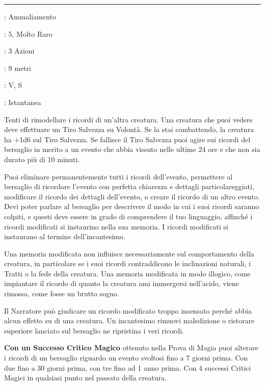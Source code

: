 \begin{multicols}{2}
\smallskip\noindent\rule{\linewidth}{2pt} \hypertarget{Modificare Memoria}{}\smallskip{}
\noindent
\begin{description}[noitemsep, topsep=0pt, parsep=0pt, partopsep=0pt, leftmargin=0cm, labelwidth=2.8cm]
	\item[\textbf{Lista di Magia}]: Ammaliamento
	\item[\textbf{Livello}]: 5, Molto Raro
	\item[\textbf{T. di Lancio}]: 3 Azioni
	\item[\textbf{Gittata}]: 9 metri
	\item[\textbf{Componenti}]: V, S
	\item[\textbf{Durata}]: Istantanea
\end{description}

Tenti di rimodellare i ricordi di un'altra creatura. Una creatura che puoi vedere deve effettuare un Tiro Salvezza su Volontà. Se la stai combattendo, la creatura ha +1d6 sul Tiro Salvezza. Se fallisce il Tiro Salvezza puoi agire sui ricordi del bersaglio in merito a un evento che abbia vissuto nelle ultime 24 ore e che non sia durato più di 10 minuti.

Puoi eliminare permanentemente tutti i ricordi dell'evento, permettere al bersaglio di ricordare l'evento con perfetta chiarezza e dettagli particolareggiati, modificare il ricordo dei dettagli dell'evento, o creare il ricordo di un altro evento. Devi poter parlare al bersaglio per descrivere il modo in cui i suoi ricordi saranno colpiti, e questi deve essere in grado di comprendere il tuo linguaggio, affinché i ricordi modificati si instaurino nella sua memoria.
I ricordi modificati si instaurano al termine dell'incantesimo.

Una memoria modificata non influisce necessariamente sul comportamento della creatura, in particolare se i suoi ricordi contraddicono le inclinazioni naturali, i Tratti o la fede della creatura. Una memoria modificata in modo illogico, come impiantare il ricordo di quanto la creatura ami immergersi nell'acido, viene rimossa, come fosse un brutto sogno.

Il Narratore può giudicare un ricordo modificato troppo insensato perché abbia alcun effetto su di una creatura. Un incantesimo rimuovi maledizione o ristorare superiore lanciato sul bersaglio ne ripristina i veri ricordi.

\textbf{Con un Successo Critico Magico} ottenuto nella Prova di Magia puoi alterare i ricordi di un bersaglio riguardo un evento svoltosi fino a 7 giorni prima. Con due fino a 30 giorni prima, con tre fino ad 1 anno prima. Con 4 successi Critici Magici in qualsiasi punto nel passato della creatura.


\end{multicols}
